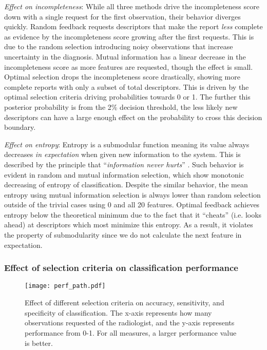 \emph{Effect on incompleteness}:
While all three methods drive the incompleteness score down with a single request for the first observation, their behavior diverges quickly.
Random feedback requests descriptors that make the report \emph{less} complete as evidence by the incompleteness score growing after the first requests.
This is due to the random selection introducing noisy observations that increase uncertainty in the diagnosis.
Mutual information has a linear decrease in the incompleteness score as more features are requested, though the effect is small.
Optimal selection drops the incompleteness score drastically, showing more complete reports with only a subset of total descriptors.
This is driven by the optimal selection criteria driving probabilities towards 0 or 1.
The further this posterior probability is from the 2\% decision threshold, the less likely new descriptors can have a large enough effect on the probability to cross this decision boundary.

\emph{Effect on entropy}:
Entropy is a submodular function meaning its value always decreases \emph{in expectation} when given new information to the system.
This is described by the principle that ``\emph{information never hurts}'' \cite{Nemhauser:1978ck,Krause:2005tr}.
Such behavior is evident in random and mutual information selection, which show monotonic decreasing of entropy of classification.
Despite the similar behavior, the mean entropy using mutual information selection is always lower than random selection outside of the trivial cases using 0 and all 20 features.
Optimal feedback achieves entropy below the theoretical minimum due to the fact that it ``cheats'' (i.e. looks ahead) at descriptors which most minimize this entropy.
As a result, it violates the property of submodularity since we do not calculate the next feature in expectation.


 \subsubsection{Effect of selection criteria on classification performance}

 
 \begin{figure}[h]
 	\centering
 	\texttt{[image: perf\_path.pdf]}
 	\caption[Effect of selection criteria on classification performance]{Effect of different selection criteria on accuracy, sensitivity, and specificity of classification. The x-axis represents how many observations requested of the radiologist, and the y-axis represents performance from 0-1. For all measures, a larger performance value is better.}
 	\label{fig:feedback_performance}
 \end{figure}

